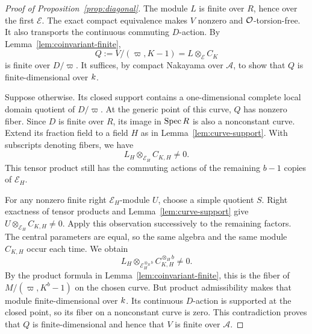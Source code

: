 \begin{proof}[Proof of Proposition~\ref{prop:diagonal}]
The module \(L\) is finite over \(R\), hence over the first
\(\mathcal E\). The exact compact equivalence makes \(V\) nonzero and
\(\mathcal O\)-torsion-free. It also transports the continuous commuting
\(D\)-action. By Lemma~\ref{lem:coinvariant-finite},
\[
 Q:=V/(\varpi,K-1)=L\otimes_{\mathcal E}C_K
\]
is finite over \(D/\varpi\). It suffices, by compact Nakayama over
\(\mathscr A\), to show that \(Q\) is finite-dimensional over \(k\).

Suppose otherwise. Its closed support contains a one-dimensional
complete local domain quotient of \(D/\varpi\). At the generic point
of this curve, \(Q\) has nonzero fiber. Since \(D\) is finite over
\(R\), its image in \(\operatorname{Spec} R\) is also a nonconstant curve. Extend
its fraction field to a field \(H\) as in
Lemma~\ref{lem:curve-support}. With subscripts denoting fibers, we have
\[
                 L_H\otimes_{\mathcal E_H}C_{K,H}\ne0.
\]
This tensor product still has the commuting actions of the remaining
\(b-1\) copies of \(\mathcal E_H\).

For any nonzero finite right \(\mathcal E_H\)-module \(U\), choose a
simple quotient \(S\). Right exactness of tensor products and
Lemma~\ref{lem:curve-support} give
\(U\otimes_{\mathcal E_H}C_{K,H}\ne0\). Apply this observation
successively to the remaining factors. The central parameters are
equal, so the same algebra and the same module \(C_{K,H}\) occur each
time. We obtain
\[
 L_H\otimes_{\mathcal E_H^{\otimes_H b}}C_{K,H}^{\otimes_H b}\ne0.
\]
By the product formula in Lemma~\ref{lem:coinvariant-finite}, this is
the fiber of \(M/(\varpi,K^b-1)\) on the chosen curve. But product
admissibility makes that module finite-dimensional over \(k\).
Its continuous \(D\)-action is supported at the closed point, so its
fiber on a nonconstant curve is zero. This contradiction proves that
\(Q\) is finite-dimensional and hence that \(V\) is finite over
\(\mathscr A\).
\end{proof}

